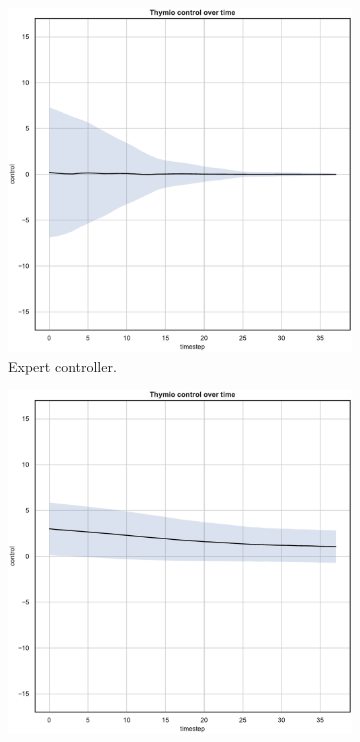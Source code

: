 \begin{figure}[!htb]
	\centering
	\begin{subfigure}[h]{0.3\textwidth}
		\centering
		\includegraphics[width=\textwidth]{contents/images/net-d6/control-overtime-omniscient}%
		\caption{Expert controller.}
	\end{subfigure}
	\hfill
	\begin{subfigure}[h]{0.3\textwidth}
		\centering
		\includegraphics[width=\textwidth]{contents/images/net-d6/control-overtime-manual}%

\end{subfigure}
\end{figure}
